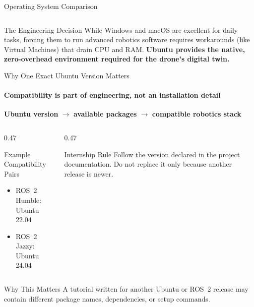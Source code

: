 \begin{frame}{Operating System Comparison}
\begin{columns}[T,onlytextwidth]
\end{columns}

\pause

\begin{alertblock}{The Engineering Decision}
    While Windows and macOS are excellent for daily tasks, forcing them to run advanced robotics software requires workarounds (like Virtual Machines) that drain CPU and RAM. \textbf{Ubuntu provides the native, zero-overhead environment required for the drone's digital twin.}
\end{alertblock}

\end{frame}



\begin{frame}{Why One Exact Ubuntu Version Matters}
\framesubtitle{Compatibility is part of engineering, not an installation detail}

\begin{center}
    \textbf{Ubuntu version}
    \(\rightarrow\)
    \textbf{available packages}
    \(\rightarrow\)
    \textbf{compatible robotics stack}
\end{center}

\pause

\begin{columns}[T,onlytextwidth]
    \begin{column}{0.47\textwidth}
        \begin{block}{Example Compatibility Pairs}
            \begin{itemize}
                \item ROS~2 Humble: Ubuntu 22.04
                \item ROS~2 Jazzy: Ubuntu 24.04
            \end{itemize}
        \end{block}
    \end{column}
    \hfill
    \begin{column}{0.47\textwidth}
        \begin{block}{Internship Rule}
            Follow the version declared in the project documentation.
            Do not replace it only because another release is newer.
        \end{block}
    \end{column}
\end{columns}

\begin{alertblock}{Why This Matters}
    A tutorial written for another Ubuntu or ROS~2 release may contain different
    package names, dependencies, or setup commands.
\end{alertblock}
\end{frame}


